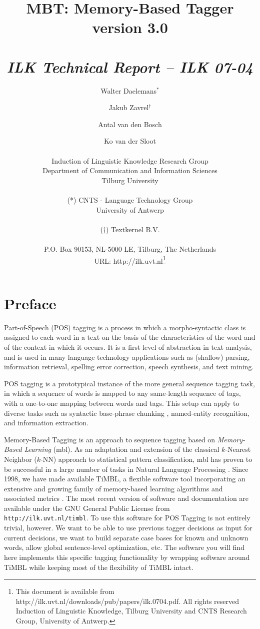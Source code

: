 \documentclass{report}
\author{Walter Daelemans$^*$ \and Jakub Zavrel$^\dagger$ \and
	Antal van den Bosch \and Ko van der Sloot\\ \ \\
	Induction of Linguistic Knowledge Research Group\\
	Department of Communication and Information Sciences\\ 
        Tilburg University \\ \\
	(*) CNTS - Language Technology Group\\
	University of Antwerp\\ \\
	($\dagger$) Textkernel B.V.\\ \\
        P.O. Box 90153, NL-5000 LE, Tilburg, The Netherlands \\ 
        URL: http://ilk.uvt.nl\thanks{This document is available from
	http://ilk.uvt.nl/downloads/pub/papers/ilk.0704.pdf. All rights reserved
	Induction of Linguistic Knowledge, Tilburg University and 
        CNTS Research Group, University of Antwerp.}}
\title{{\huge MBT: Memory-Based Tagger} \\ \vspace*{0.5cm}
{\bf version 3.0} \\ \vspace*{0.5cm}{\huge Reference Guide}\\
\vspace*{1cm} {\it ILK Technical Report -- ILK 07-04}}
\begin{document}

\maketitle

\tableofcontents

\chapter*{Preface}

Part-of-Speech (POS) tagging is a process in which a morpho-syntactic
class is assigned to each word in a text on the basis of the
characteristics of the word and of the context in which it occurs. It
is a first level of abstraction in text analysis, and is used in many
language technology applications such as (shallow) parsing,
information retrieval, spelling error correction, speech synthesis, and
text mining.

POS tagging is a prototypical instance of the more general sequence
tagging task, in which a sequence of words is mapped to any
same-length sequence of tags, with a one-to-one mapping between words
and tags. This setup can apply to diverse tasks such as syntactic
base-phrase chunking \cite{Sang+00}, named-entity recognition, and
information extraction.

Memory-Based Tagging is an approach to sequence tagging based on {\em
  Memory-Based Learning} ({\sc mbl}).  As an adaptation and extension
of the classical $k$-Nearest Neighbor ($k$-NN) approach to statistical
pattern classification, {\sc mbl} has proven to be successful in a
large number of tasks in Natural Language Processing
\cite{Daelemans+05}. Since 1998, we have made available TiMBL, a
flexible software tool incorporating an extensive and growing family
of memory-based learning algorithms and associated metrics
\cite{Daelemans+07}. The most recent version of software and
documentation are available under the GNU General Public License from
{\tt http://ilk.uvt.nl/timbl}.  To use this software for POS Tagging
is not entirely trivial, however. We want to be able to use previous
tagger decisions as input for current decisions, we want to build
separate case bases for known and unknown words, allow global
sentence-level optimization, etc.  The software you will find here
implements this specific tagging functionality by wrapping software
around TiMBL while keeping most of the flexibility of TiMBL intact.
\end{document}
